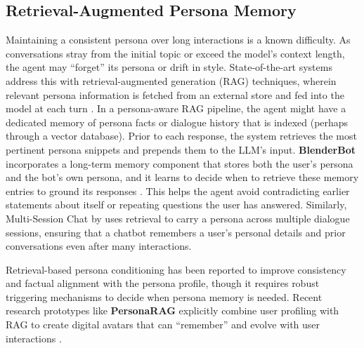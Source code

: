\subsection{Retrieval-Augmented Persona Memory}
Maintaining a consistent persona over long interactions is a known difficulty. As conversations stray from the initial topic or exceed the model's context length, the agent may ``forget'' its persona or drift in style. State-of-the-art systems address this with retrieval-augmented generation (RAG) techniques, wherein relevant persona information is fetched from an external store and fed into the model at each turn \cite{shuster2022blenderbot3deployedconversational,xu-etal-2022-beyond}. In a persona-aware RAG pipeline, the agent might have a dedicated memory of persona facts or dialogue history that is indexed (perhaps through a vector database).  Prior to each response, the system retrieves the most pertinent persona snippets and prepends them to the LLM's input. \textbf{BlenderBot} \cite{shuster2022blenderbot3deployedconversational} incorporates a long-term memory component that stores both the user's persona and the bot's own persona, and it learns to decide when to retrieve these memory entries to ground its responses \cite{shuster2022blenderbot3deployedconversational}. This helps the agent avoid contradicting earlier statements about itself or repeating questions the user has answered. Similarly, Multi-Session Chat by \cite{xu-etal-2022-beyond} uses retrieval to carry a persona across multiple dialogue sessions, ensuring that a chatbot remembers a user's personal details and prior conversations even after many interactions.

Retrieval-based persona conditioning has been reported to improve consistency and factual alignment with the persona profile, though it requires robust triggering mechanisms to decide when persona memory is needed. Recent research prototypes like \textbf{PersonaRAG} explicitly combine user profiling with RAG to create digital avatars that can ``remember'' and evolve with user interactions \cite{kimara2025personaaileveragingretrievalaugmentedgeneration}. 

